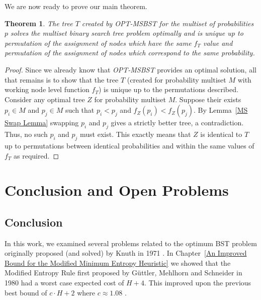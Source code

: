 \documentclass[letterpaper,12pt,titlepage,oneside,final]{book}
\theoremstyle{plain}
\newtheorem{thm}{Theorem}[section]
\begin{document}
We are now ready to prove our main theorem.

\begin{thm}
The tree $T$ created by \textit{OPT-MSBST} for the multiset of probabilities $p$ solves the multiset binary search tree problem optimally and is unique up to permutation of the assignment of nodes which have the same $f_T$ value and permutation of the assignment of nodes which correspond to the same probability.
\end{thm}

\begin{proof}
Since we already know that \textit{OPT-MSBST} provides an optimal solution, all that remains is to show that the tree $T$ (created for probability multiset $M$ with working node level function $f_T$) is unique up to the permutations described. Consider any optimal tree $Z$ for probability multiset $M$. Suppose their exists $p_i \in M$ and $p_j \in M$ such that $p_i < p_j$ and $f_Z(p_i) < f_Z(p_j)$. By Lemma~\ref{MS Swap Lemma} swapping $p_i$ and $p_j$ gives a strictly better tree, a contradiction. Thus, no such $p_i$ and $p_j$ must exist. This exactly means that $Z$ is identical to $T$ up to permutations between identical probabilities and within the same values of $f_T$ as required.
\end{proof}






\chapter{Conclusion and Open Problems} \label{Conclusion and Open Problems}

\section{Conclusion}

In this work, we examined several problems related to the optimum BST problem originally proposed (and solved) by Knuth in 1971 \cite{knuth1971optimum}. In Chapter~\ref{An Improved Bound for the Modified Minimum Entropy Heuristic} we showed that the Modified Entropy Rule first proposed by  G{\"u}ttler, Mehlhorn and Schneider in 1980 had a worst case expected cost of $H+4$. This improved upon the previous best bound of $c\cdot H+2$ where $c \approx 1.08$ \cite{guttler1980binary}.
\end{document}
